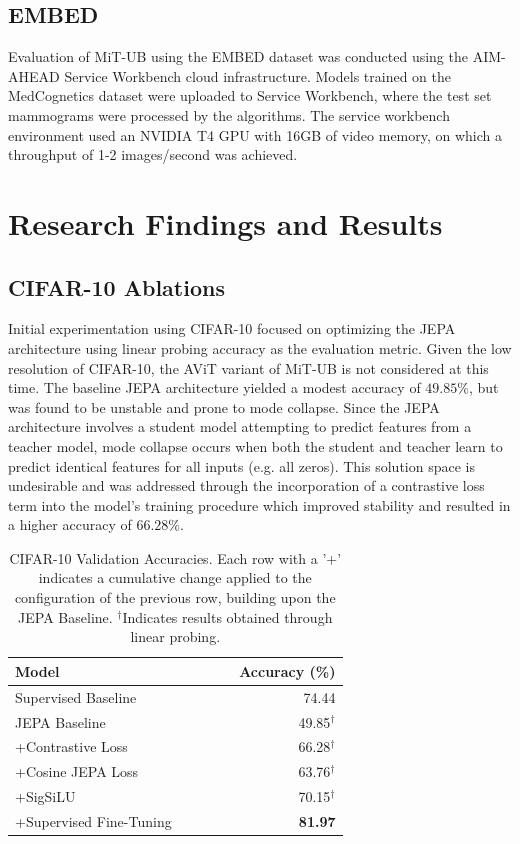 \documentclass[12pt]{article}
\begin{document}
\subsection{EMBED}

Evaluation of MiT-UB using the EMBED dataset was conducted using the AIM-AHEAD Service Workbench cloud infrastructure. 
Models trained on the MedCognetics dataset were uploaded to Service Workbench, where the test set mammograms were processed
by the algorithms. The service workbench environment used an NVIDIA T4 GPU with 16GB of video memory, on which a throughput of 1-2 images/second was achieved.


\section{Research Findings and Results}
\noindent

\subsection{CIFAR-10 Ablations}

Initial experimentation using CIFAR-10 focused on optimizing the JEPA architecture using linear probing accuracy as the evaluation metric.
Given the low resolution of CIFAR-10, the AViT variant of MiT-UB is not considered at this time.
The baseline JEPA architecture yielded a modest accuracy of $49.85\%$, but was found to be unstable and prone to mode collapse. Since
the JEPA architecture involves a student model attempting to predict features from a teacher model, mode collapse occurs when both the 
student and teacher learn to predict identical features for all inputs (e.g. all zeros). This solution space is undesirable and was addressed
through the incorporation of a contrastive loss term into the model's training procedure which improved stability and resulted in a higher 
accuracy of $66.28\%$. 

\begin{table}[H]
    \centering
    \begin{tabular}{p{0.67\linewidth}r}
        \toprule
        Model & Accuracy (\%) \\
        \midrule
        Supervised Baseline & 74.44 \\
        \midrule
        JEPA Baseline & 49.85$^{\dagger}$ \\
        +Contrastive Loss & 66.28$^{\dagger}$ \\
        +Cosine JEPA Loss & 63.76$^{\dagger}$ \\
        +SigSiLU & 70.15$^{\dagger}$ \\
        +Supervised Fine-Tuning & \textbf{81.97} \\
        \bottomrule
    \end{tabular}
    \caption{CIFAR-10 Validation Accuracies. Each row with a '+' indicates a cumulative change applied to the configuration of the previous row, building upon the JEPA Baseline. $^\dagger$Indicates results obtained through linear probing.}
    \label{tab:cifar10-accuracies}
\end{table}
\end{document}
